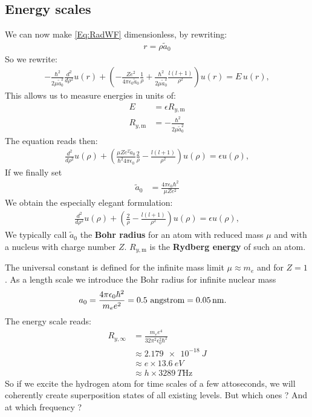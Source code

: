 \documentclass[10pt]{article}
\newcommand{\aOs}{\tilde{a}_{0}}
\begin{document}
\subsection{Energy scales}
We can now make \eqref{Eq:RadWF} dimensionless, by rewriting:
\begin{align}
r = \rho \aOs
\end{align}
So we rewrite:
\begin{align}
-\frac{\hbar^2}{2\mu \aOs^2}\frac{d^2}{d\rho^2}u(r) + \left( -\frac{Ze^2}{4\pi\epsilon_0\aOs }\frac{1}{\rho} + \frac{\hbar^2}{2\mu \aOs^2} \frac{l(l+1)}{\rho^2} \right) u(r) = E \, u(r),
\end{align}
This allows us to measure energies in units of:
\begin{align}
E &= \epsilon R_{y,\textrm{m}}\\
R_{y,\textrm{m}} &= -\frac{\hbar^2}{2\mu \aOs^2}
\end{align}
The equation reads then:
\begin{align}
\frac{d^2}{d\rho^2}u(\rho) + \left( \frac{\mu Ze^2 \aOs}{\hbar^2 4\pi\epsilon_0}\frac{2}{\rho} - \frac{l(l+1)}{\rho^2} \right) u(\rho) = \epsilon u(\rho),
\end{align}
If we finally set 
\begin{align}
\aOs &=\frac{4\pi\epsilon_0 \hbar^2}{\mu Z e^2}
\end{align}
We obtain the especially elegant formulation:
\begin{align}
\frac{d^2}{d\rho^2}u(\rho) + \left( \frac{2}{\rho} - \frac{l(l+1)}{\rho^2} \right) u(\rho) = \epsilon u(\rho),
\end{align}
We typically call $\aOs$ the \textbf{Bohr radius} for an atom with reduced mass $\mu$ and with a nucleus with charge number $Z$. $R_{y,\textrm{m}}$ is the \textbf{Rydberg energy} of such an atom.

The universal constant is defined for the infinite mass limit $\mu \approx m_e$ and for $Z=1$. As a length scale we introduce the Bohr radius for infinite nuclear mass
\begin{align}
a_0 &= \frac{4\pi\epsilon_0\hbar^2}{m_e e^2} = \text{\num{0.5} \text{angstrom}} = \text{\SI{0.05}{\nano\meter}}.
\end{align}
The energy scale reads:
\begin{align}
R_{y,\infty} &= \frac{m_e e^4}{32 \pi^2 \epsilon_0^2 \hbar^2}\\
&\approx \SI{2.179e-18}{J}\\
& \approx e \times\SI{13.6}{eV}\\
&\approx h \times\SI{3289}{T\hertz}
\end{align}
 So if we excite the hydrogen atom for time scales of a few attoseconds, we will coherently create superposition states of all existing levels. But which ones ? And at which frequency ?
 
\end{document}
